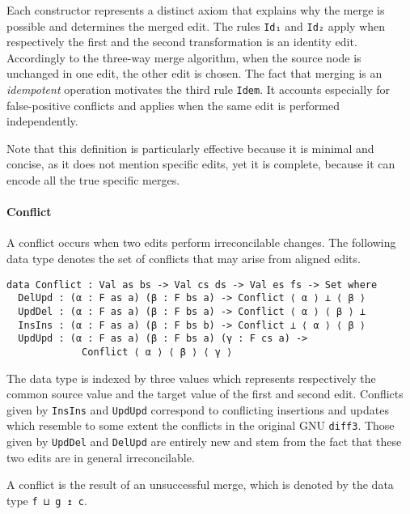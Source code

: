 \documentclass[preprint]{sigplanconf}
\begin{document}
	Each constructor represents a distinct axiom that explains why
	the merge is possible and determines the merged edit.
	The rules \texttt{Id₁} and \texttt{Id₂} apply when 
	respectively the first and the second transformation is an identity edit.
	Accordingly to the three-way merge algorithm, when the source node
	is unchanged in one edit, the other edit is chosen.
	The fact that merging is an \emph{idempotent} operation motivates the 
	third rule \texttt{Idem}.
	It accounts especially for false-positive conflicts and applies 
	when the same edit is performed independently.
	
	Note that this definition is particularly effective because it is 
	minimal and concise, as it does not mention specific
	edits, yet it is complete, because it can encode all the true specific merges.	

	\paragraph{Conflict}
	A conflict occurs when two edits perform irreconcilable changes.
	The following data type denotes the set of conflicts that may arise
	from aligned edits.
	
\begin{verbatim}	
data Conflict : Val as bs -> Val cs ds -> Val es fs -> Set where
  DelUpd : (α : F as a) (β : F bs a) -> Conflict ⟨ α ⟩ ⊥ ⟨ β ⟩
  UpdDel : (α : F as a) (β : F bs a) -> Conflict ⟨ α ⟩ ⟨ β ⟩ ⊥ 
  InsIns : (α : F as a) (β : F bs b) -> Conflict ⊥ ⟨ α ⟩ ⟨ β ⟩
  UpdUpd : (α : F as a) (β : F bs a) (γ : F cs a) ->
             Conflict ⟨ α ⟩ ⟨ β ⟩ ⟨ γ ⟩    
\end{verbatim}

	The data type is indexed by three values which represents respectively
	the common source value and the target value of the first and second
	edit.	Conflicts given by \texttt{InsIns} and \texttt{UpdUpd}	 correspond to 
	conflicting insertions and updates which resemble to some extent the
	conflicts in the original GNU \texttt{diff3}. Those given by \texttt{UpdDel} 
	and \texttt{DelUpd} are entirely new and stem from the fact that these two
	edits are in general irreconcilable.

	A conflict is the result of an unsuccessful merge, which is denoted
	by the data type \texttt{f ⊔ g ↥ c}.
\end{document}

